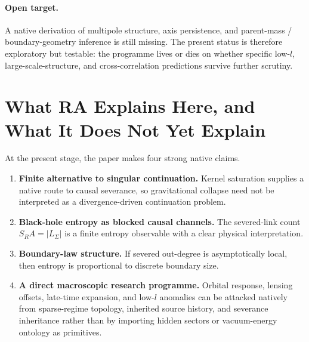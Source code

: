 \documentclass[11pt]{article}
\def\ell{l}%
\def\mathrm#1{#1}%
\def\SRa{S_RA}%
\newcommand{\SRa}{\ensuremath{S_{\mathrm{RA}}}}
\begin{document}
\paragraph{Open target.} A native derivation of multipole structure, axis persistence, and parent-mass / boundary-geometry inference is still missing. The present status is therefore exploratory but testable: the programme lives or dies on whether specific low-$\ell$, large-scale-structure, and cross-correlation predictions survive further scrutiny.

\section{What RA Explains Here, and What It Does Not Yet Explain}

At the present stage, the paper makes four strong native claims.
\begin{enumerate}[nosep]
    \item \textbf{Finite alternative to singular continuation.} Kernel saturation supplies a native route to causal severance, so gravitational collapse need not be interpreted as a divergence-driven continuation problem.
    \item \textbf{Black-hole entropy as blocked causal channels.} The severed-link count $\SRa=|L_\Sigma|$ is a finite entropy observable with a clear physical interpretation.
    \item \textbf{Boundary-law structure.} If severed out-degree is asymptotically local, then entropy is proportional to discrete boundary size.
    \item \textbf{A direct macroscopic research programme.} Orbital response, lensing offsets, late-time expansion, and low-$\ell$ anomalies can be attacked natively from sparse-regime topology, inherited source history, and severance inheritance rather than by importing hidden sectors or vacuum-energy ontology as primitives.
\end{enumerate}
\end{document}

